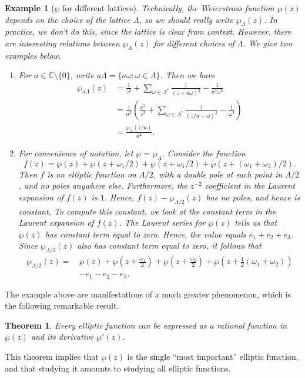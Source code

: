 \documentclass[12pt,reqno]{amsart}
\theoremstyle{plain}
\newtheorem{eg}{Example}
\numberwithin{equation}{section}
\newtheorem{theorem}{Theorem}[section]
\begin{document}
\begin{leftbar}
\begin{eg}[$\wp$ for different lattices]\label{ex: wp for lattices}
    Technically, the Weierstrass function $\wp(z)$ depends on the choice of the lattice $\Lambda$, so we should really write $\wp_{\Lambda}(z)$. In practice, we don't do this, since the lattice is clear from context. However, there are interesting relations between $\wp_{\Lambda}(z)$ for different choices of $\Lambda$. We give two examples below.

    \begin{enumerate}[leftmargin=*,label=$(\alph*)$]
        \item For $a\in\mathbb C\setminus \{0\}$, write $a\Lambda=\{a\omega :\omega\in\Lambda\}$. Then we have
\begin{align*}
    \wp_{a\Lambda}(z) &= \frac{1}{z^2} + \sum_{\omega\in \Lambda^*} \frac{1}{(z+a\omega)^2}-\frac{1}{a^2\omega^2}\\
    &=\frac{1}{a^2}\left(\frac{a^2}{z^2} + \sum_{\omega\in \Lambda^*} \frac{1}{(z/a+ \omega)^2}-\frac{1}{\omega^2}\right)\\
    &= \frac{\wp_{\Lambda}(z/a)}{a^2}.
\end{align*}
\item For convenience of notation, let $\wp = \wp_\Lambda$. Consider the function 
\[f(z) = \wp(z)+\wp(z+\omega_1/2) + \wp (z+\omega_1/2) + \wp(z+(\omega_1+\omega_2)/2).\]
Then $f$ is an elliptic function on $\Lambda/2$, with a double pole at each point in $\Lambda/2$, and no poles anywhere else. Furthermore, the $z^{-2}$ coefficient in the Laurent expansion of $f(z)$ is $1$. Hence, $f(z) - \wp_{\Lambda/2}(z)$ has no poles, and hence is constant. To compute this constant, we look at the constant term in the Laurent expansion of $f(z)$. The Laurent series for $\wp(z)$ tells us that $\wp(z)$ has constant term equal to zero. Hence, the value equals $e_1+e_2+e_3$. Since $\wp_{\Lambda/2}(z)$ also has constant term equal to zero, it follows that
\begin{align*}
\wp_{\Lambda/2}(z) =\, &\wp(z)+\wp(z+\tfrac{\omega_1}{2})+ \wp (z+\tfrac{\omega_2}2) + \wp(z+\tfrac 12(\omega_1+\omega_2))\\ &- e_1 -e_2 - e_3.
\end{align*}
    \end{enumerate}
\end{eg}
\end{leftbar}

\medskip
The example above are manifestations of a much greater phenomenon, which is the following remarkable result.
\begin{theorem}\label{thm: classification}
    Every elliptic function can be expressed as a rational function in $\wp(z)$ and its derivative $\wp'(z)$. 
\end{theorem}
This theorem implies that $\wp(z)$ is the single ``most important'' elliptic function, and that studying it amounts to studying all elliptic functions.
\end{document}
